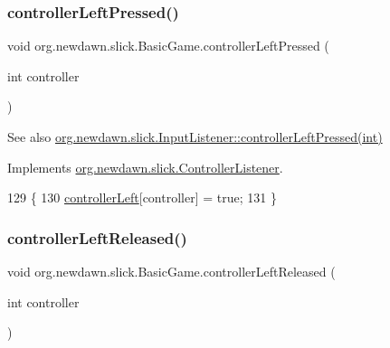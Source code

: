 \subsubsection{\texorpdfstring{controller\+Left\+Pressed()}{controllerLeftPressed()}}
{\footnotesize\ttfamily void org.\+newdawn.\+slick.\+Basic\+Game.\+controller\+Left\+Pressed (\begin{DoxyParamCaption}\item[{int}]{controller }\end{DoxyParamCaption})\hspace{0.3cm}{\ttfamily [inline]}}

\begin{DoxySeeAlso}{See also}
\mbox{\hyperlink{interfaceorg_1_1newdawn_1_1slick_1_1_controller_listener_abfb38c5d8e44b7613a49cbfaf19d5585}{org.\+newdawn.\+slick.\+Input\+Listener\+::controller\+Left\+Pressed(int)}} 
\end{DoxySeeAlso}


Implements \mbox{\hyperlink{interfaceorg_1_1newdawn_1_1slick_1_1_controller_listener_abfb38c5d8e44b7613a49cbfaf19d5585}{org.\+newdawn.\+slick.\+Controller\+Listener}}.


\begin{DoxyCode}
129                                                       \{
130         \mbox{\hyperlink{classorg_1_1newdawn_1_1slick_1_1_basic_game_ab9942a3607c7c1bb9f68c7f49514edb6}{controllerLeft}}[controller] = \textcolor{keyword}{true};
131     \}
\end{DoxyCode}
\mbox{\label{classorg_1_1newdawn_1_1slick_1_1_basic_game_a0fd5869789b811258bc2d8d562c36243}} 
\subsubsection{\texorpdfstring{controller\+Left\+Released()}{controllerLeftReleased()}}
{\footnotesize\ttfamily void org.\+newdawn.\+slick.\+Basic\+Game.\+controller\+Left\+Released (\begin{DoxyParamCaption}\item[{int}]{controller }\end{DoxyParamCaption})\hspace{0.3cm}{\ttfamily [inline]}}

